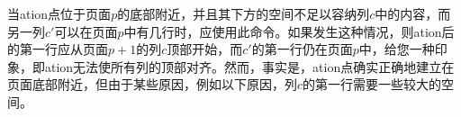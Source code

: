 
当\sync{}ation点位于页面$p$的底部附近，并且其下方的空间不足以容纳列$c$中的内容，而另一列$c'$可以在页面$p$中有几行时，应使用此命令。如果发生这种情况，则\sync{}ation后的第一行应从页面$p+1$的列$c$顶部开始，而$c'$的第一行仍在页面$p$中，给您一种印象，即\sync{}ation无法使所有列的顶部对齐。然而，事实是，\sync{}ation点确实正确地建立在页面底部附近，但由于某些原因，例如以下原因，列$c$的第一行需要一些较大的空间。
% 
% 
% 

